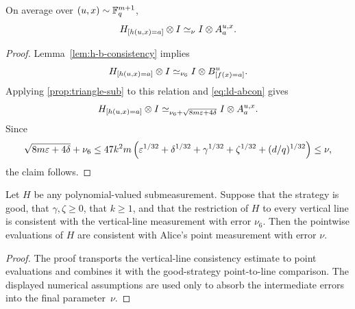 \begin{corollary}\label{cor:h-a-consistency}
	\leanok
	On average over $(u,x) \sim \mathbb{F}_q^{m+1}$,
	\[
		H_{[h(u,x)=a]} \otimes I \simeq_{\nu} I \otimes A_a^{u,x}.
	\]
\end{corollary}
\begin{proof}
	\leanok
	Lemma~\ref{lem:h-b-consistency} implies
	\[
		H_{[h(u,x)=a]} \otimes I \simeq_{\nu_6} I \otimes B^u_{[f(x)=a]}.
	\]
	Applying \ref{prop:triangle-sub} to this relation and \ref{eq:ld-abcon} gives
	\[
		H_{[h(u,x)=a]} \otimes I \simeq_{\nu_6+\sqrt{8m\varepsilon+4\delta}} I \otimes A_a^{u,x}.
	\]
	Since
	\[
		\sqrt{8m\varepsilon+4\delta} + \nu_6
		\le
		47k^2m\left(\varepsilon^{1/32}+\delta^{1/32}+\gamma^{1/32}+\zeta^{1/32}+(d/q)^{1/32}\right)
		\le \nu,
	\]
	the claim follows.
\end{proof}

\begin{lemma}
	\label{lem:h-a-consistency-from-line-consistency}
	\leanok
	Let $H$ be any polynomial-valued submeasurement. Suppose that the strategy is
	good, that $\gamma,\zeta \ge 0$, that $k \ge 1$, and that the restriction of
	$H$ to every vertical line is consistent with the vertical-line measurement
	with error $\nu_6$. Then the pointwise evaluations of $H$ are consistent with
	Alice's point measurement with error $\nu$.
\end{lemma}
\begin{proof}
	\leanok
	The proof transports the vertical-line consistency estimate to point
	evaluations and combines it with the good-strategy point-to-line comparison.
	The displayed numerical assumptions are used only to absorb the intermediate
	errors into the final parameter~$\nu$.
\end{proof}

